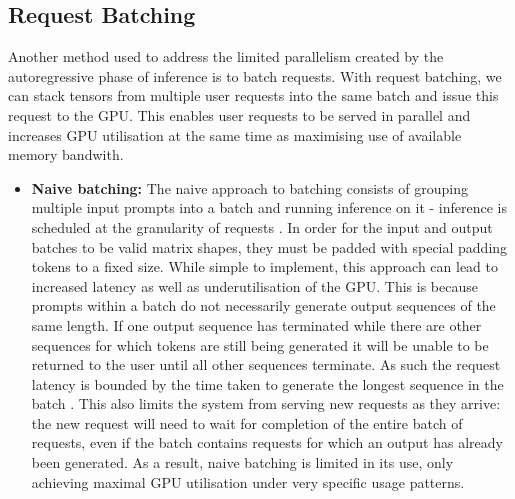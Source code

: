 \documentclass[11pt,twoside]{report}
\begin{document}
\subsection{Request Batching}
Another method used to address the limited parallelism created by the autoregressive phase of inference is to batch requests. 
With request batching, we can stack tensors from multiple user requests into the same batch and issue this request to the GPU.
This enables user requests to be served in parallel and increases GPU utilisation at the same time as maximising use of available memory bandwith.

\begin{itemize}
  \item \textbf{Naive batching:} The naive approach to batching consists of grouping multiple input prompts into a batch and running inference on it - inference is scheduled at the granularity of requests \cite{yu2022orca}.
    In order for the input and output batches to be valid matrix shapes, they must be padded with special padding tokens to a fixed size.
    While simple to implement, this approach can lead to increased latency as well as underutilisation of the GPU. 
    This is because prompts within a batch do not necessarily generate output sequences of the same length. 
    If one output sequence has terminated while there are other sequences for which tokens are still being generated it will be unable to be returned to the user until all other sequences terminate.
    As such the request latency is bounded by the time taken to generate the longest sequence in the batch \cite{yu2022orca}.
    This also limits the system from serving new requests as they arrive: the new request will need to wait for completion of the entire batch of requests, even if the batch contains requests for which an output has already been generated.
    As a result, naive batching is limited in its use, only achieving maximal GPU utilisation under very specific usage patterns.


\end{itemize}
\end{document}
